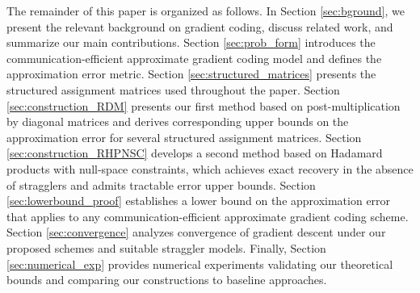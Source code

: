 \documentclass[journal,draftcls,onecolumn]{IEEEtran}
\theoremstyle{mystyle}
\begin{document}
The remainder of this paper is organized as follows. In Section \ref{sec:bground}, we present the relevant background on gradient coding, discuss related work, and summarize our main contributions. Section \ref{sec:prob_form} introduces the communication-efficient approximate gradient coding model and defines the approximation error metric. Section \ref{sec:structured_matrices} presents the structured assignment matrices used throughout the paper. Section \ref{sec:construction_RDM} presents our first method based on post-multiplication by diagonal matrices and derives corresponding upper bounds on the approximation error for several structured assignment matrices. Section \ref{sec:construction_RHPNSC} develops a second method based on Hadamard products with null-space constraints, which achieves exact recovery in the absence of stragglers and admits tractable error upper bounds. Section \ref{sec:lowerbound_proof} establishes a lower bound on the approximation error that applies to any communication-efficient approximate gradient coding scheme. Section \ref{sec:convergence} analyzes convergence of gradient descent under our proposed schemes and suitable straggler models. Finally, Section \ref{sec:numerical_exp} provides numerical experiments validating our theoretical bounds and comparing our constructions to baseline approaches.

\end{document}
